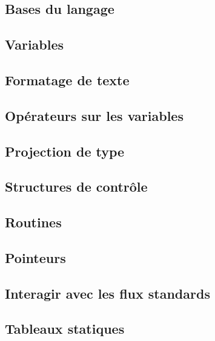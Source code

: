 \documentclass{minitelreport}
\begin{document}
\begin{refsection}
	\chapter{Bases du langage}
	\label{chap:bases_du_langage}
		\section{Variables}
			\label{sec:variables}
			
		\section{Formatage de texte}
			\label{sec:formatage_du_texte}
			
		\section{Opérateurs sur les variables}
			\label{sec:operateurs_variables}
			
		\section{Projection de type}
			\label{sec:projection_type}
			
		\section{Structures de contrôle}
			\label{sec:structures_controle}
			
		\section{Routines}
			\label{sec:routines}
			
		\section{Pointeurs}
			\label{sec:pointeurs}
			
		\section{Interagir avec les flux standards}
			\label{sec:flux_standards}
			
		\section{Tableaux statiques}
			\label{sec:tableaux_statiques}
			

\end{refsection}
\end{document}

